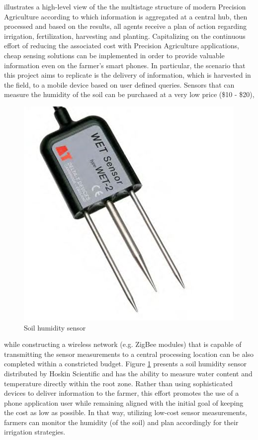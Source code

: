 \documentclass{article}
\begin{document}
\noindent illustrates a high-level view of the the multistage structure of modern Precision Agriculture according to which information is aggregated at a central hub, then processed and based on the results, all agents receive a plan of action regarding irrigation, fertilization, harvesting and planting.  Capitalizing on the continuous effort of reducing the associated cost with Precision Agriculture applications, cheap sensing solutions can be implemented in order to provide valuable information even on the farmer's smart phones. In particular, the scenario that this project aims to replicate is the delivery of information, which is harvested in the field, to a mobile device based on user defined queries. Sensors that can measure the humidity of the soil can be purchased at a very low price (\$10 - \$20), 
\begin{figure}
\begin{center}
   \includegraphics[width=1\linewidth,trim={0 0 0 0cm},clip]{Images/HumSens.jpg}
\end{center}
\vspace{-0.2in}
   \caption{Soil humidity sensor}
   \label{fig:Humsens}
\end{figure}

\noindent while constructing a wireless network (e.g. ZigBee modules) that is capable of transmitting
the sensor measurements to a central processing location can be also completed within a constricted budget.
Figure \ref{fig:Humsens} presents a soil humidity sensor distributed by Hoskin Scientific and has the ability to measure water content and temperature directly within the root zone. Rather than using sophisticated devices to deliver information to the farmer, this effort promotes the use of a phone application user while remaining aligned with the initial goal of keeping the cost as low as possible. In that way, utilizing low-cost sensor measurements, farmers can monitor the humidity (of the soil) and plan accordingly for their irrigation strategies.
\end{document}
